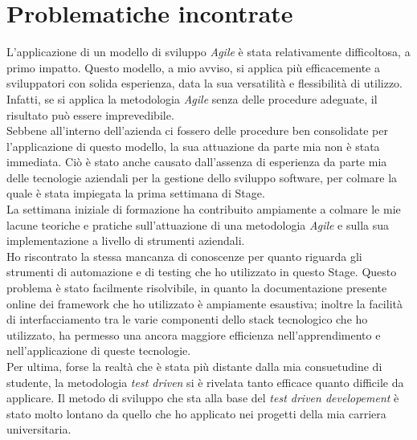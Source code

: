 \section{Problematiche incontrate}
L'applicazione di un modello di sviluppo \emph{Agile} è stata relativamente difficoltosa, a primo impatto. Questo modello, a mio avviso, si applica più efficacemente a sviluppatori con solida esperienza, data la sua versatilità e flessibilità di utilizzo. Infatti, se si applica la metodologia \emph{Agile} senza delle procedure adeguate, il risultato può essere imprevedibile.\\
Sebbene all'interno dell'azienda ci fossero delle procedure ben consolidate per l'applicazione di questo modello, la sua attuazione da parte mia non è stata immediata. Ciò è stato anche causato dall'assenza di esperienza da parte mia delle tecnologie aziendali per la gestione dello sviluppo software, per colmare la quale è stata impiegata la prima settimana di Stage.\\
La settimana iniziale di formazione ha contribuito ampiamente a colmare le mie lacune teoriche e pratiche sull'attuazione di una metodologia \emph{Agile} e sulla sua implementazione a livello di strumenti aziendali.\\
Ho riscontrato la stessa mancanza di conoscenze per quanto riguarda gli strumenti di automazione e di testing che ho utilizzato in questo Stage. Questo problema è stato facilmente risolvibile, in quanto la documentazione presente online dei framework che ho utilizzato è ampiamente esaustiva; inoltre la facilità di interfacciamento tra le varie componenti dello stack tecnologico che ho utilizzato, ha permesso una ancora maggiore efficienza nell'apprendimento e nell'applicazione di queste tecnologie.\\
Per ultima, forse la realtà che è stata più distante dalla mia consuetudine di studente, la metodologia \emph{test driven} si è rivelata tanto efficace quanto difficile da applicare. Il metodo di sviluppo che sta alla base del \emph{test driven developement} è stato molto lontano da quello che ho applicato nei progetti della mia carriera universitaria.

